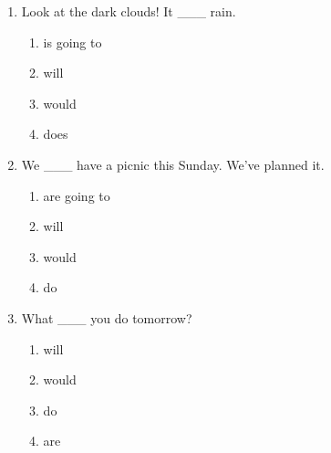 \documentclass[11pt,a4paper]{ctexart}
\begin{document}
\begin{enumerate}[leftmargin=*,itemsep=4pt]
\begin{enumerate}[label=\Alph*.,leftmargin=2em,itemsep=1pt,topsep=2pt]
\end{enumerate}
\item Look at the dark clouds! It \_\_\_ rain.
\begin{enumerate}[label=\Alph*.,leftmargin=2em,itemsep=1pt,topsep=2pt]
\item is going to
\item will
\item would
\item does
\end{enumerate}
\item We \_\_\_ have a picnic this Sunday. We’ve planned it.
\begin{enumerate}[label=\Alph*.,leftmargin=2em,itemsep=1pt,topsep=2pt]
\item are going to
\item will
\item would
\item do
\end{enumerate}
\item What \_\_\_ you do tomorrow?
\begin{enumerate}[label=\Alph*.,leftmargin=2em,itemsep=1pt,topsep=2pt]
\item will
\item would
\item do
\item are
\end{enumerate}
\end{enumerate}
\end{document}

